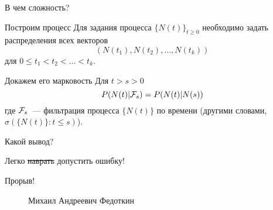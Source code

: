 \documentclass[10pt]{beamer}
\begin{document}
  
  
\begin{frame}{В чем сложность?}
    \begin{block}{Построим процесс}
Для задания процесса $\{N(t)\}_{t\geqslant 0}$ необходимо задать распределения всех векторов 
$$(N(t_1), N(t_2), \ldots, N(t_k))$$ для $0 \leqslant t_1< t_2 < \ldots < t_k$.
\end{block}

    \begin{block}{Докажем его марковость}
    Для $t>s>0$
    $$
    P(N(t) |  {\cal F}_s) = P(N(t) |  N(s))
    $$
    где ${\cal F}_s$~--- фильтрация процесса $\{N(t)\}$ по времени (другими словами, $\sigma(\{N(t)\}\colon t \leqslant s)$).
    
\end{block}

\end{frame}

\begin{frame}{Какой вывод?}
 \begin{center}
\Huge{ Легко \sout{наврать} \linebreak допустить ошибку!}
\end{center}
\end{frame}


\begin{frame}{Прорыв!}
      
    \begin{figure}[h]
    \centering
    \caption{Михаил Андреевич Федоткин}
    \label{VK:fig:3}
  \end{figure}
\end{frame}
\end{document}
